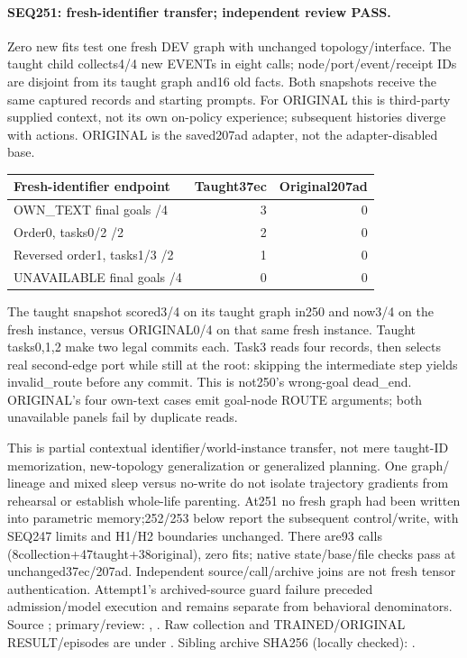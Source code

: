 \documentclass[11pt]{article}
\begin{document}
\paragraph{SEQ251: fresh-identifier transfer; independent review PASS.}
Zero new fits test one fresh DEV graph with unchanged topology/interface.
The taught child collects4/4 new EVENTs in eight calls; node/port/event/receipt
IDs are disjoint from its taught graph and16 old facts. Both snapshots receive
the same captured records and starting prompts. For ORIGINAL this is third-party
supplied context, not its own on-policy experience; subsequent histories diverge
with actions. ORIGINAL is the saved207ad adapter, not the adapter-disabled base.
\begin{center}
\small
\begin{tabular}{lrr}
\toprule
Fresh-identifier endpoint & Taught37ec & Original207ad \\
\midrule
OWN\_TEXT final goals /4 & 3 & 0 \\
Order0, tasks0/2 /2 & 2 & 0 \\
Reversed order1, tasks1/3 /2 & 1 & 0 \\
UNAVAILABLE final goals /4 & 0 & 0 \\
\bottomrule
\end{tabular}
\end{center}
The taught snapshot scored3/4 on its taught graph in250 and now3/4 on the fresh
instance, versus ORIGINAL0/4 on that same fresh instance. Taught tasks0,1,2 make
two legal commits each. Task3 reads four records, then selects real second-edge
port  while still at the root: skipping the intermediate
step yields invalid\_route before any commit. This is not250's wrong-goal
dead\_end. ORIGINAL's four own-text cases emit goal-node ROUTE arguments;
both unavailable panels fail by duplicate reads.

This is partial contextual identifier/world-instance transfer, not mere taught-ID
memorization, new-topology generalization or generalized planning. One graph/
lineage and mixed sleep versus no-write do not isolate trajectory gradients
from rehearsal or establish whole-life parenting. At251 no fresh graph had
been written into parametric memory;252/253 below report the subsequent
control/write, with SEQ247 limits and H1/H2 boundaries unchanged. There are93 calls
(8collection+47taught+38original), zero fits; native state/base/file checks pass
at unchanged37ec/207ad. Independent source/call/archive joins are not fresh
tensor authentication. Attempt1's archived-source guard failure preceded
admission/model execution and remains separate from behavioral denominators.
Source ; primary/review:
,
.
Raw collection and TRAINED/ORIGINAL RESULT/episodes are under
.
Sibling archive SHA256 (locally checked):
.
\end{document}
